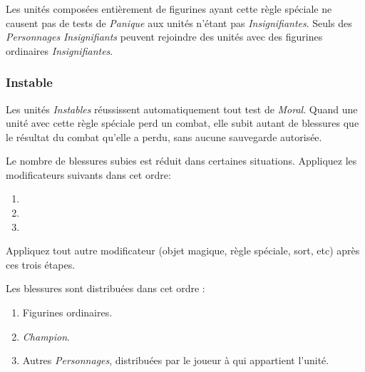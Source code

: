 \subsubsection*{}

Les unités composées entièrement de figurines ayant cette règle spéciale ne causent pas de tests de \emph{Panique} aux unités n'étant pas \emph{Insignifiantes}. Seuls des \emph{Personnages} \emph{Insignifiants} peuvent rejoindre des unités avec des figurines ordinaires \emph{Insignifiantes}.

\subsubsection*{Instable}

Les unités \emph{Instables} réussissent automatiquement tout test de \emph{Moral}. Quand une unité avec cette règle spéciale perd un combat, elle subit autant de blessures que le résultat du combat qu'elle a perdu, sans aucune sauvegarde autorisée.

Le nombre de blessures subies est réduit dans certaines situations. Appliquez les modificateurs suivants dans cet ordre:
\begin{enumerate}
\item {}
\item {}
\item {}
\end{enumerate}
Appliquez tout autre modificateur (objet magique, règle spéciale, sort, etc) après ces trois étapes.

Les blessures sont distribuées dans cet ordre :
\begin{enumerate}
\item Figurines ordinaires.
\item \emph{Champion}.
\item Autres \emph{Personnages}, distribuées par le joueur à qui appartient l'unité.
\end{enumerate}


